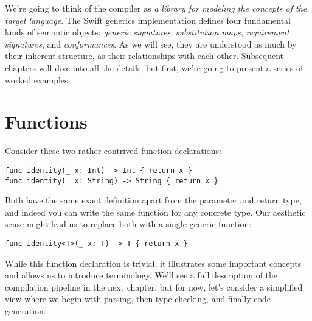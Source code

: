 \documentclass[../generics]{subfiles}
\begin{document}
We're going to think of the compiler as \textsl{a library for modeling the concepts of the target language}. The Swift generics implementation defines four fundamental kinds of semantic objects: \emph{generic signatures}, \emph{substitution maps}, \emph{requirement signatures}, and \emph{conformances}. As we will see, they are understood as much by their inherent structure, as their relationships with each other. Subsequent chapters will dive into all the details, but first, we're going to present a series of worked examples.

\section{Functions}

Consider these two rather contrived function declarations:
\begin{Verbatim}
func identity(_ x: Int) -> Int { return x }
func identity(_ x: String) -> String { return x }
\end{Verbatim}
Both have the same exact definition apart from the parameter and return type, and indeed you can write the same function for any concrete type. Our aesthetic sense might lead us to replace both with a single generic function:
\begin{Verbatim}
func identity<T>(_ x: T) -> T { return x }
\end{Verbatim}
While this function declaration is trivial, it illustrates some important concepts and allows us to introduce terminology. We'll see a full description of the compilation pipeline in the next chapter, but for now, let's consider a simplified view where we begin with parsing, then type checking, and finally code generation.

\begin{figure}\label{identity ast}
\begin{center}
\end{center}
\end{figure}
\end{document}
